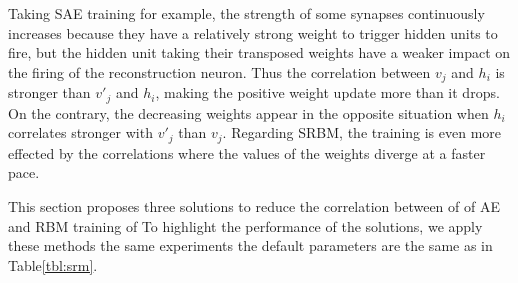Taking SAE training for example, the strength of some synapses continuously increases because they have a relatively strong weight to trigger hidden units to fire, but the hidden unit taking their transposed weights have a weaker impact on the firing of the reconstruction neuron.
Thus the correlation between $v_j$ and $h_i$ is stronger than $v'_j$ and $h_i$, making the positive weight update more \protect{} \protect{} than it drops.
On the contrary, the decreasing weights appear in the opposite situation when $h_i$ correlates stronger with $v'_j$ than $v_j$.
Regarding \protect{} \protect{} SRBM, the training is even more effected by the correlations where the values of the weights diverge at a faster pace.
 
 
This section proposes three solutions to reduce the correlation between \protect{} \protect{} of \protect{} \protect{} of \protect{} \protect{} AE and RBM training \protect{} \protect{} of \protect{} \protect{}
To highlight the performance of the solutions, we apply these methods \protect{} \protect{} the same experiments \protect{} \protect{} the default parameters are the same as in Table\ref{tbl:srm}.
